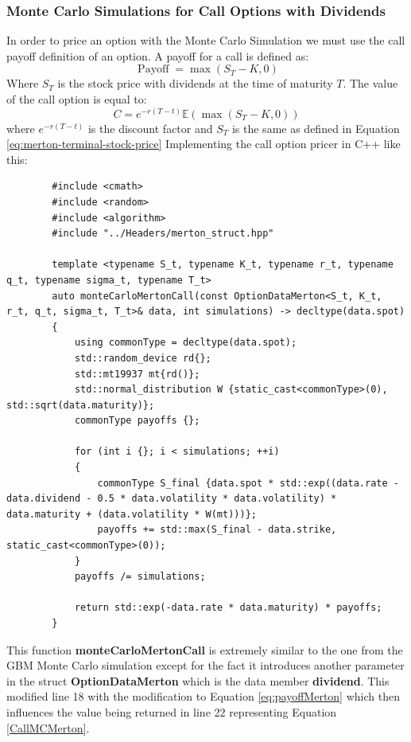 \documentclass[12pt]{article}
\numberwithin{equation}{section}
\begin{document}
\subsubsection{Monte Carlo Simulations for Call Options with Dividends}
In order to price an option with the Monte Carlo Simulation we must use the call payoff definition of an option. A payoff for a call is defined as:
\begin{equation}
	\operatorname{Payoff} = \max(S_T - K, 0)
	\label{eq:payoffMerton}
\end{equation}
Where $S_T$ is the stock price with dividends at the time of maturity $T$. 
\newline \newline
The value of the call option is equal to:
\begin{equation}
	C = e^{-r(T-t)} \mathbb{E}(\max(S_T - K, 0))
	\label{CallMCMerton}
\end{equation}
where $e^{-r(T-t)}$ is the discount factor and $S_T$ is the same as defined in Equation \ref{eq:merton-terminal-stock-price}
\newpage
Implementing the call option pricer in C++ like this: 
\begin{listing}[H]
	\begin{verbatim}
		#include <cmath>
		#include <random>
		#include <algorithm>
		#include "../Headers/merton_struct.hpp"
		
		template <typename S_t, typename K_t, typename r_t, typename q_t, typename sigma_t, typename T_t>
		auto monteCarloMertonCall(const OptionDataMerton<S_t, K_t, r_t, q_t, sigma_t, T_t>& data, int simulations) -> decltype(data.spot)
		{
			using commonType = decltype(data.spot);
			std::random_device rd{};
			std::mt19937 mt{rd()};
			std::normal_distribution W {static_cast<commonType>(0), std::sqrt(data.maturity)};
			commonType payoffs {};
			
			for (int i {}; i < simulations; ++i)
			{
				commonType S_final {data.spot * std::exp((data.rate - data.dividend - 0.5 * data.volatility * data.volatility) * data.maturity + (data.volatility * W(mt)))};
				payoffs += std::max(S_final - data.strike, static_cast<commonType>(0));
			}
			payoffs /= simulations;
			
			return std::exp(-data.rate * data.maturity) * payoffs;
		}
	\end{verbatim}
	\caption{Black-Scholes -Merton Call using Monte Carlo Simulations}
	\label{lst:mertonmontecarloCall}
\end{listing}
\FloatBarrier
This function \textbf{monteCarloMertonCall} is extremely similar to the one from the GBM Monte Carlo simulation except for the fact it introduces another parameter in the struct \textbf{OptionDataMerton} which is the data member \textbf{dividend}. \newline This modified line 18 with the modification to Equation \ref{eq:payoffMerton} which then influences the value being returned in line 22 representing Equation \ref{CallMCMerton}. 
\end{document}
